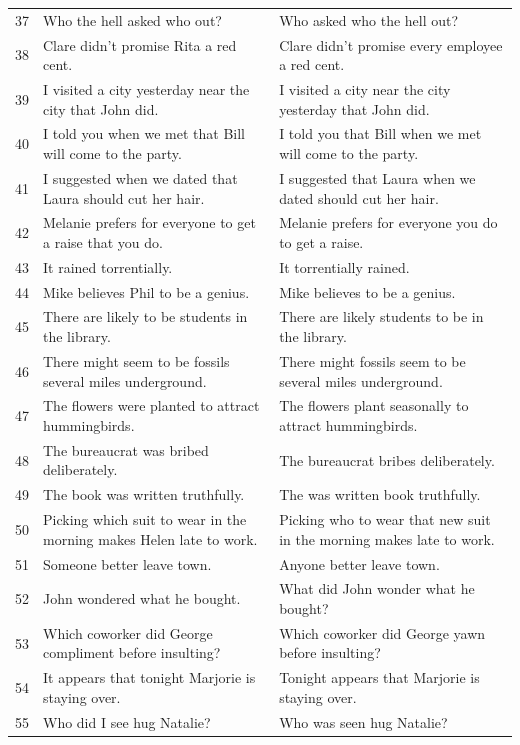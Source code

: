 \documentclass[doc]{apa6}
\begin{document}
\begin{small}
\begin{longtable}{p{1cm} | p{8.5cm} | p{8.5cm}}
37 & Who the hell asked who out? & Who asked who the hell out?\\
38 & Clare didn't promise Rita a red cent. & Clare didn't promise every employee a red cent.\\
39 & I visited a city yesterday near the city that John did. & I visited a city near the city yesterday that John did.\\
40 & I told you when we met that Bill will come to the party. & I told you that Bill when we met will come to the party.\\
41 & I suggested when we dated that Laura should cut her hair. & I suggested that Laura  when we dated should cut her hair.\\
42 & Melanie prefers for everyone to get a raise that you do. & Melanie prefers for everyone you do to get a raise.\\
43 & It rained torrentially. & It torrentially rained.\\
44 & Mike believes Phil to be a genius. & Mike believes to be a genius.\\
45 & There are likely to be students in the library. & There are likely students to be in the library.\\
46 & There might seem to be fossils several miles underground. & There might fossils seem to be several miles underground.\\
47 & The flowers were planted to attract hummingbirds. & The flowers plant seasonally to attract hummingbirds.\\
48 & The bureaucrat was bribed deliberately. & The bureaucrat bribes deliberately.\\
49 & The book was written truthfully. & The was written book truthfully.\\
50 & Picking which suit to wear in the morning makes Helen late to work. & Picking who to wear that new suit in the morning makes late to work.\\
51 & Someone better leave town. & Anyone better leave town.\\
52 & John wondered what he bought. & What did John wonder what he bought?\\
53 & Which coworker did George compliment before insulting? & Which coworker did George yawn before insulting?\\
54 & It appears that tonight Marjorie is staying over. & Tonight appears that Marjorie is staying over.\\
55 & Who did I see hug Natalie? & Who was seen hug Natalie?\\

\end{longtable}
\end{small}
\end{document}
